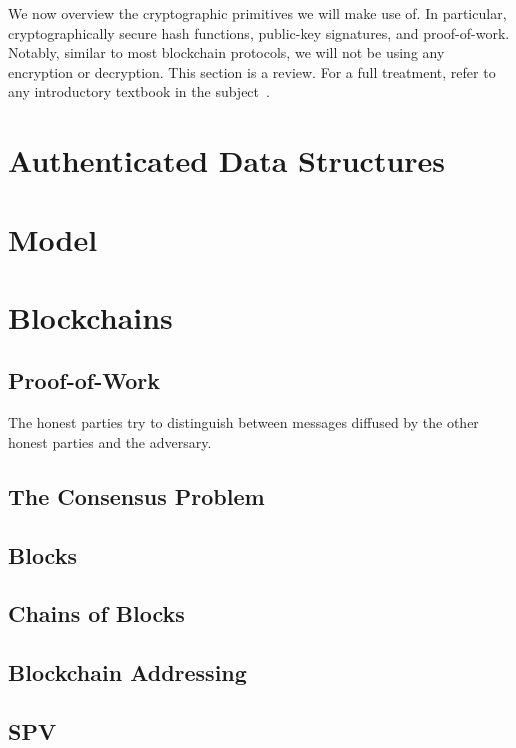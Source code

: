 We now overview the cryptographic primitives we will make use of. In particular,
cryptographically secure hash functions, public-key signatures, and
proof-of-work. Notably, similar to most blockchain protocols, we will not be
using any encryption or decryption. This section is a review. For a full
treatment, refer to any introductory textbook in the subject~\cite{katz,handbook,foundations1,foundations2}.





\section{Authenticated Data Structures}


\section{Model}



\section{Blockchains}
\subsection{Proof-of-Work}
The
honest parties try to distinguish between messages diffused by the other honest
parties and the adversary.

\subsection{The Consensus Problem}
\subsection{Blocks}
\subsection{Chains of Blocks}
\subsection{Blockchain Addressing}
\subsection{SPV}

